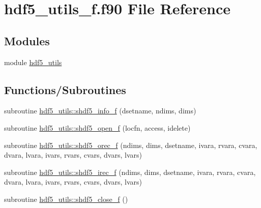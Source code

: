 \hypertarget{hdf5__utils__f_8f90}{}\section{hdf5\+\_\+utils\+\_\+f.\+f90 File Reference}
\label{hdf5__utils__f_8f90}
\subsection*{Modules}
\begin{DoxyCompactItemize}
\item 
module \hyperlink{namespacehdf5__utils}{hdf5\+\_\+utils}
\end{DoxyCompactItemize}
\subsection*{Functions/\+Subroutines}
\begin{DoxyCompactItemize}
\item 
subroutine \hyperlink{namespacehdf5__utils_a5149c551d73478f502b8660e3bdbd5b8}{hdf5\+\_\+utils\+::shdf5\+\_\+info\+\_\+f} (dsetname, ndims, dims)
\item 
subroutine \hyperlink{namespacehdf5__utils_ab621eee22271edfd3bf37b44d5b657e6}{hdf5\+\_\+utils\+::shdf5\+\_\+open\+\_\+f} (locfn, access, idelete)
\item 
subroutine \hyperlink{namespacehdf5__utils_a2ede1f04f554f0906040f2802b2ccbd3}{hdf5\+\_\+utils\+::shdf5\+\_\+orec\+\_\+f} (ndims, dims, dsetname, ivara, rvara, cvara, dvara, lvara, ivars, rvars, cvars, dvars, lvars)
\item 
subroutine \hyperlink{namespacehdf5__utils_a84928db7f00b3aedc24a2c20281dddb1}{hdf5\+\_\+utils\+::shdf5\+\_\+irec\+\_\+f} (ndims, dims, dsetname, ivara, rvara, cvara, dvara, lvara, ivars, rvars, cvars, dvars, lvars)
\item 
subroutine \hyperlink{namespacehdf5__utils_aced9a0b34d2b1e59a1867be622a7c8a4}{hdf5\+\_\+utils\+::shdf5\+\_\+close\+\_\+f} ()
\end{DoxyCompactItemize}
